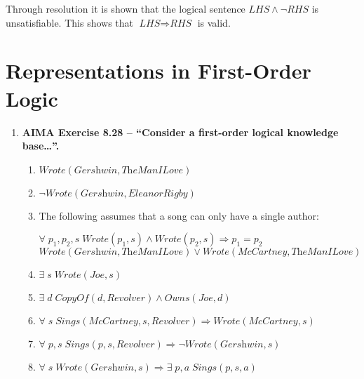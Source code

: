 \begin{enumerate}
\begin{enumerate}
Through resolution it is shown that the logical sentence $\textit{LHS} \land \neg \textit{RHS}$ is unsatisfiable. This shows that $\textit{LHS} \Rightarrow \textit{RHS}$ is valid.

\end{enumerate}

\end{enumerate}

\section{Representations in First-Order Logic}

\begin{enumerate}

\item \textbf{AIMA Exercise 8.28 -- ``Consider a first-order logical knowledge base\ldots''.}

\begin{enumerate}

\item
$\textit{Wrote}(\textit{Gershwin}, \textit{TheManILove})$

\item
$\neg \textit{Wrote}(\textit{Gershwin}, \textit{EleanorRigby})$

\item The following assumes that a song can only have a single author:

$\forall \; p_1, p_2, s \; \textit{Wrote}(p_1, s) \land \textit{Wrote}(p_2, s) \Rightarrow p_1 = p_2$\\
$\textit{Wrote}(\textit{Gershwin}, \textit{TheManILove}) \lor \textit{Wrote}(\textit{McCartney}, \textit{TheManILove})$

\item
$\exists \; s \; \textit{Wrote}(\textit{Joe}, s)$

\item
$\exists \; d \; \textit{CopyOf}(d, \textit{Revolver}) \land \textit{Owns}(\textit{Joe}, d)$

\item
$\forall \; s \; \textit{Sings}(\textit{McCartney}, s, \textit{Revolver}) \Rightarrow \textit{Wrote}(\textit{McCartney}, s)$

\item
$\forall \; p, s \; \textit{Sings}(p, s, \textit{Revolver}) \Rightarrow \neg \textit{Wrote}(\textit{Gershwin}, s)$

\item
$\forall \; s \; \textit{Wrote}(\textit{Gershwin}, s) \Rightarrow \exists \; p, a \; \textit{Sings}(p, s, a)$


\end{enumerate}
\end{enumerate}
